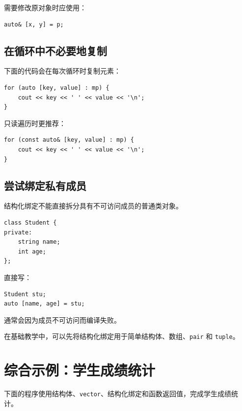 \documentclass[UTF8,12pt,a4paper]{ctexart}
\begin{document}
需要修改原对象时应使用：

\begin{lstlisting}
auto& [x, y] = p;
\end{lstlisting}

\subsection{在循环中不必要地复制}

下面的代码会在每次循环时复制元素：

\begin{lstlisting}
for (auto [key, value] : mp) {
    cout << key << ' ' << value << '\n';
}
\end{lstlisting}

只读遍历时更推荐：

\begin{lstlisting}
for (const auto& [key, value] : mp) {
    cout << key << ' ' << value << '\n';
}
\end{lstlisting}

\subsection{尝试绑定私有成员}

结构化绑定不能直接拆分具有不可访问成员的普通类对象。

\begin{lstlisting}
class Student {
private:
    string name;
    int age;
};
\end{lstlisting}

直接写：

\begin{lstlisting}
Student stu;
auto [name, age] = stu;
\end{lstlisting}

通常会因为成员不可访问而编译失败。

在基础教学中，可以先将结构化绑定用于简单结构体、数组、\texttt{pair} 和 \texttt{tuple}。

\section{综合示例：学生成绩统计}

下面的程序使用结构体、\texttt{vector}、结构化绑定和函数返回值，完成学生成绩统计。
\end{document}
